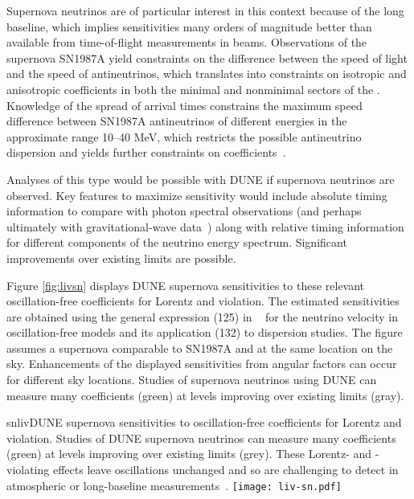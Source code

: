Supernova neutrinos are of particular interest in this context because of the long baseline, which implies sensitivities many orders of magnitude better than available from time-of-flight measurements in beams. Observations of the supernova SN1987A yield constraints on the difference between the speed of light and the speed of antineutrinos, which translates into constraints on isotropic and anisotropic coefficients in both the minimal and nonminimal sectors of the . Knowledge of the spread of arrival times constrains the maximum speed difference between SN1987A antineutrinos of different energies in the approximate range 10--40 MeV, which restricts the possible antineutrino dispersion and yields further constraints on  coefficients~\cite{Kostelecky:2011gq}.

Analyses of this type would be possible with DUNE if supernova neutrinos are observed. Key features to maximize sensitivity would include absolute timing information to compare with photon spectral observations (and perhaps ultimately with gravitational-wave data~\cite{Kostelecky:2016kfm})  along with relative timing information for different components of the neutrino energy spectrum. Significant improvements over existing limits are possible.

Figure \ref{fig:livsn} displays DUNE supernova sensitivities 
to these relevant oscillation-free coefficients 
for Lorentz and  violation.
The estimated sensitivities are obtained using
the general expression (125) in ~\cite{Kostelecky:2011gq}
for the neutrino velocity in oscillation-free models
and its application (132) to dispersion studies.
The figure assumes a supernova comparable to SN1987A
and at the same location on the sky.
Enhancements of the displayed sensitivities 
from angular factors can occur for different sky locations.
Studies of supernova neutrinos using DUNE 
can measure many coefficients (green) 
at levels improving over existing limits (gray).

\begin{dunefigure}{snliv}{DUNE supernova sensitivities to oscillation-free coefficients for Lorentz and  violation. Studies of DUNE supernova neutrinos can measure many coefficients (green) at levels improving over existing limits (grey). These Lorentz- and - violating effects leave oscillations unchanged and so are challenging to detect in atmospheric or long-baseline measurements~\cite{kostelecky}.\label{fig:livsn}}
\texttt{[image: liv-sn.pdf]}
\end{dunefigure}

